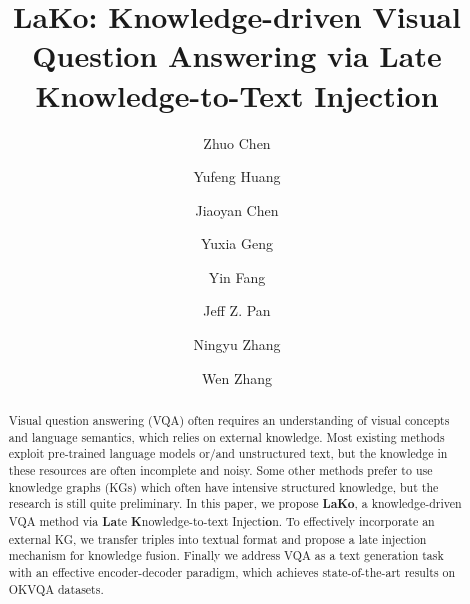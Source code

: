 \documentclass[sigconf]{acmart}
\newcommand{\cjy}[1]{{\color{black}#1}}
\begin{document}
\title{LaKo: Knowledge-driven Visual Question Answering via Late \\ Knowledge-to-Text Injection}

\author{Zhuo Chen}

\author{Yufeng Huang}

\author{Jiaoyan Chen}
  
\author{Yuxia Geng}

\author{Yin Fang}

\author{Jeff Z. Pan}
 
 
 \author{Ningyu Zhang}

\author{Wen Zhang}





\begin{abstract}
Visual question answering (VQA) often requires an understanding of visual concepts and language semantics, \cjy{which relies on} external knowledge. 
\cjy{Most existing methods exploit pre-trained language models or/and unstructured text, but the knowledge in these resources are often incomplete and noisy.
Some other methods prefer to use knowledge graphs (KGs) which often have intensive structured knowledge, but the research is still quite preliminary.}
In this paper,  we propose 
\textbf{LaKo}, a \cjy{knowledge-driven} VQA method via \textbf{La}te \textbf{K}nowledge-to-text Injecti\textbf{o}n. 
\cjy{To effectively incorporate an external KG, we transfer triples into textual format and propose a late  injection mechanism for knowledge fusion.}
Finally we address VQA as a text generation task with an effective encoder-decoder paradigm, which achieves state-of-the-art results on OKVQA datasets.
\end{abstract}
\end{document}
